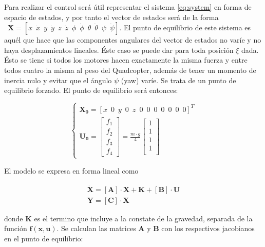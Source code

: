 \documentclass[twoside,11pt]{report}
\begin{document}
Para realizar el control será útil representar el sistema \ref{eq:system} en forma de espacio de estados, y por tanto el vector de estados será de la forma $\enspace \pmb{X}=\left[ x \enspace \dot{x} \enspace y \enspace \dot{y} \enspace z \enspace \dot{z} \enspace \phi \enspace \dot{\phi} \enspace \theta \enspace \dot{\theta} \enspace \psi \enspace \dot{\psi} \right]$. El punto de equilibrio de este sistema es aquél que hace que las componentes angulares del vector de estados no varíe y no haya desplazamientos lineales. Éste caso se puede dar para toda posición $\xi$ dada. Ésto se tiene si todos los motores hacen exactamente la misma fuerza y entre todos cuatro la misma al peso del Quadcopter, además de tener un momento de inercia nulo y evitar que el ángulo  $\psi$ (yaw) varíe. Se trata de un punto de equilibrio forzado. El punto de equilibrio será entonces:

\begin{equation}
\begin{cases}
\pmb{X_0}=\left[x \enspace 0 \enspace y \enspace 0 \enspace z \enspace 0 \enspace 0 \enspace 0 \enspace 0 \enspace 0 \enspace 0 \enspace 0 \right]^{T} \\
\pmb{U_0}=\left[ \begin{array}{l}
f_{1} \\
f_{2} \\
f_{3} \\
f_{4} \end{array} \right] = \frac{m \cdot g}{4} \left[ \begin{array}{l}
1 \\
1 \\
1 \\
1 \\ \end{array} \right]
\end{cases}
\end{equation}

El modelo se expresa en forma lineal como

\begin{equation}
\begin{array}{l}
\pmb{\dot{X}}=[\pmb{A}] \cdot \pmb{X} + \pmb{K} + [\pmb{B}] \cdot \pmb{U} \\
\pmb{Y} = [\pmb{C}] \cdot \pmb{X} 
\end{array}
\end{equation} 

donde $\pmb{K}$ es el termino que incluye a la constate de la gravedad, separada de la función $\pmb{f(x,u)}$. Se calculan las matrices $\pmb{A}$ y $\pmb{B}$ con los respectivos jacobianos en el punto de equilibrio:
\end{document}
